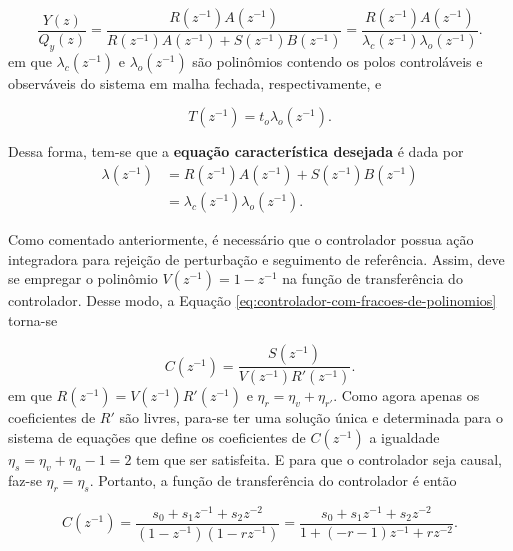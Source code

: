 \begin{equation}
    \label{eq:ft-da-saida-para-perturbacao-na-saida}
    \frac{Y(z)}{Q_{y}(z)} = \frac{R(z^{-1})A(z^{-1})}
                                 {R(z^{-1})A(z^{-1})+S(z^{-1})B(z^{-1})}
                          = \frac{R(z^{-1})A(z^{-1})}
                                 {\lambda_{c}(z^{-1})\lambda_{o}(z^{-1})}.
\end{equation} em que $\lambda_{c}(z^{-1})$ e $\lambda_{o}(z^{-1})$ são polinômios
contendo os polos controláveis e observáveis do sistema em malha fechada,
respectivamente, e 

\begin{equation}
    \label{eq:numerador-do-filtro-de-referencia}
    T(z^{-1}) = t_{o}\lambda_{o}(z^{-1}).
\end{equation}

Dessa forma, tem-se que a \textbf{equação característica desejada} é dada por
\begin{equation}
    \label{eq:equacao-caracteristica-sem-coeficientes}
    \begin{split}
        \lambda(z^{-1}) &= R(z^{-1})A(z^{-1})+S(z^{-1})B(z^{-1}) \\
                        &= \lambda_{c}(z^{-1})\lambda_{o}(z^{-1}).
    \end{split}
\end{equation}

Como comentado anteriormente, é necessário que o controlador possua ação
integradora para rejeição de perturbação e seguimento de referência. Assim, deve
se empregar o polinômio $V(z^{-1}) = 1 - z^{-1}$ na função de transferência do
controlador. Desse modo, a Equação
\ref{eq:controlador-com-fracoes-de-polinomios} torna-se

\begin{equation}
    \label{eq:controlador-com-fracoes-de-polinomios-com-integrador}
    C(z^{-1}) = \frac{S(z^{-1})}{V(z^{-1})R'(z^{-1})}.
\end{equation} em que $R(z^{-1}) = V(z^{-1})R'(z^{-1})$ e
$\eta_r = \eta_v + \eta_{r'}$. Como agora apenas os coeficientes de $R'$ são
livres, para-se ter uma solução única e determinada para o sistema de equações
que define os coeficientes de $C(z^{-1})$ a igualdade $\eta_s = \eta_v + \eta_a
- 1 = 2$ tem que ser satisfeita. E para que o controlador seja causal, faz-se
$\eta_r = \eta_s$. Portanto, a função de transferência do controlador é então

\begin{equation}
    C(z^{-1}) = \frac{s_0+s_1z^{-1}+s_2z^{-2}}{(1-z^{-1})(1-rz^{-1})} 
              = \frac{s_0+s_1z^{-1}+s_2z^{-2}}{1+(-r-1)z^{-1}+rz^{-2}}.
\end{equation}


